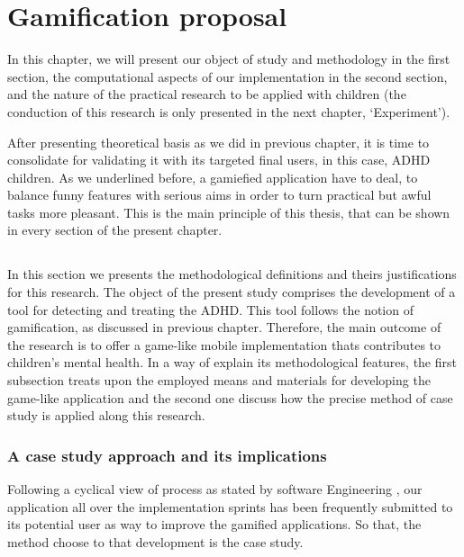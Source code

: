 \chapter{Gamification proposal}
\label{ch:gamificationProposal}

In this chapter, we will present our object of study and methodology in the first section, the computational aspects of our implementation in the second section, and the nature of the practical research to be applied with children (the conduction of this research is only presented in the next chapter, `Experiment'). 

After presenting theoretical basis as we did in previous chapter, it is time to consolidate for validating it with its targeted final users, in this case, ADHD children. As we underlined before, a gamiefied application have to deal, to balance funny features with serious aims in order to turn practical but awful tasks more pleasant. This is the main principle of this thesis, that can be shown in every section of the present chapter.


\section{}

In this section we presents the methodological definitions and theirs justifications for this research. The object of the present study comprises the development of a tool for detecting and treating the ADHD. This tool follows the notion of gamification, as discussed in previous chapter. Therefore, the main outcome of the research is to offer a game-like mobile implementation thats contributes to children's mental health. In a way of explain its methodological features, the first subsection treats upon the employed means and materials for developing the game-like application and the second one discuss how the precise method of case study is applied along this research.

\subsection{A case study approach and its implications}

Following a cyclical view of process as stated by software Engineering \citep{pressman}, our application all over the implementation sprints has been frequently submitted to its potential user as way to improve the gamified applications. So that, the method choose to that development is the case study.

